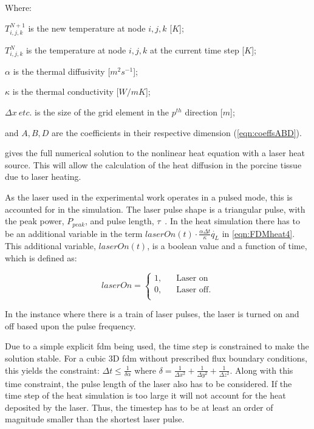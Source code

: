 \noindent Where:

	\indent $T^{N+1}_{i,j,k}$ is the new temperature at node $i,j,k$ [$K$];
	
	\indent $T^N_{i,j,k}$ is the temperature at node $i,j,k$ at the current time step [$K$];
	
	\indent $\alpha$ is the thermal diffusivity [$m^2 s^{-1}$];
	
	\indent $\kappa$ is the thermal conductivity [$W/m K$];
	
	\indent $\Delta x\ etc.$ is the size of the grid element in the $p^{th}$ direction [$m$];
	
	\indent and $A, B,D$ are the coefficients in their respective dimension (\cref{eqn:coeffsABD}).

	\medskip
	
 gives the full numerical solution to the nonlinear heat equation with a laser heat source. This will allow the calculation of the heat diffusion in the porcine tissue due to laser heating.

\medskip

As the laser used in the experimental work operates in a pulsed mode, this is accounted for in the simulation. The laser pulse shape is a triangular pulse, with the peak power, $P_{peak}$, and pulse length, $\tau$~\cite{pixelco2manual}. In the heat simulation there has to be an additional variable in the term $laserOn(t)\cdot\tfrac{\alpha \Delta t}{\kappa}\dot{q_L}$ in \cref{eqn:FDMheat4}. This additional variable, $laserOn(t)$, is a boolean value and a function of time, which is defined as:

\[   
laserOn = 
     \begin{cases}
       \text{1,} &\quad\text{Laser on}\\
       \text{0,} &\quad\text{Laser off}.\\
     \end{cases}
\]

In the instance where there is a train of laser pulses, the laser is turned on and off based upon the pulse frequency.

\medskip

Due to a simple explicit \gls*{fdm} being used, the time step is constrained to make the solution stable. For a cubic 3D \gls*{fdm} without prescribed flux boundary conditions, this yields the constraint: $\Delta t \leq \tfrac{1}{\delta \alpha}$ where $\delta=\tfrac{1}{\Delta x^2}+\tfrac{1}{\Delta y^2}+\tfrac{1}{\Delta z^2}$. Along with this time constraint, the pulse length of the laser also has to be considered. If the time step of the heat simulation is too large it will not account for the heat deposited by the laser. Thus, the timestep has to be at least an order of magnitude smaller than the shortest laser pulse.

